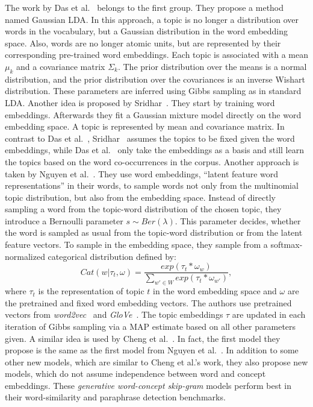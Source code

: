 \documentclass{sig-alternate-05-2015}
\begin{document}
The work by Das et al.~\cite{Das2015} belongs to the first group. They propose a method named Gaussian LDA.
In this approach, a topic is no longer a distribution over words in the vocabulary, but a Gaussian distribution in the word embedding space.
Also, words are no longer atomic units, but are represented by their corresponding pre-trained word embeddings.
Each topic is associated with a mean $\mu_k$ and a covariance matrix $\Sigma_k$.
The prior distribution over the means is a normal distribution, and the prior distribution over the covariances is an inverse Wishart distribution.
These parameters are inferred using Gibbs sampling as in standard LDA. %
Another idea is proposed by Sridhar~\cite{Sridhar2015}.
They start by training word embeddings.
Afterwards they fit a Gaussian mixture model directly on the word embedding space.
A topic is represented by mean and covariance matrix.
In contrast to Das et al.~\cite{Das2015}, Sridhar~\cite{Sridhar2015} assumes the topics to be fixed given the word embeddings, while Das et al.~\cite{Das2015} only take the embeddings as a basis and still learn the topics based on the word co-occurrences in the corpus.
Another approach is taken by Nguyen et al.~\cite{Nguyen2015}.
They use word embeddings, ``latent feature word representations'' in their words, to sample words not only from the multinomial topic distribution, but also from the embedding space.
Instead of directly sampling a word from the topic-word distribution of the chosen topic, they introduce a Bernoulli parameter $s \sim Ber(\lambda)$.
This parameter decides, whether the word is sampled as usual from the topic-word distribution or from the latent feature vectors.
To sample in the embedding space, they sample from a softmax-normalized categorical distribution defined by:
\begin{equation*}
       Cat(w | \tau_t, \omega) = \frac{exp(\tau_t * \omega_w)}{\sum_{w' \in W} exp(\tau_t * \omega_{w'})},
\end{equation*}
where $\tau_t$ is the representation of topic $t$ in the word embedding space and $\omega$ are the pretrained and fixed word embedding vectors.
The authors use pretrained vectors from \emph{word2vec}~\cite{Mikolov2013a} and \emph{GloVe}~\cite{Pennington2014}.
The topic embeddings $\tau$ are updated in each iteration of Gibbs sampling via a MAP estimate based on all other parameters given.
A similar idea is used by Cheng et al.~\cite{Cheng2015}.
In fact, the first model they propose is the same as the first model from Nguyen et al.~\cite{Nguyen2015}.
In addition to some other new models, which are similar to Cheng et al.'s work, they also propose new models, which do not assume independence between word and concept embeddings.
These \emph{generative word-concept skip-gram} models perform best in their word-similarity and paraphrase detection benchmarks.
\end{document}
